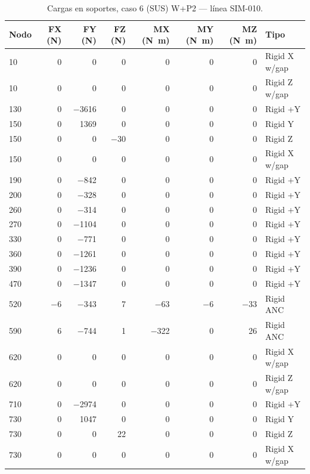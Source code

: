 \begin{table}[htbp]
  \centering
  \footnotesize
  \caption{Cargas en soportes, caso 6 (SUS) W+P2 — línea SIM-010.}
  \label{tab:restricciones-sus}
  \begin{tabular}{lrrrrrrl}
    \toprule
    Nodo & FX (\si{N}) & FY (\si{N}) & FZ (\si{N}) & MX (\si{N.m}) & MY (\si{N.m}) & MZ (\si{N.m}) & Tipo \\
    \midrule
    10 & \num{0} & \num{0} & \num{0} & \num{0} & \num{0} & \num{0} & Rigid X w/gap \\
    10 & \num{0} & \num{0} & \num{0} & \num{0} & \num{0} & \num{0} & Rigid Z w/gap \\
    130 & \num{0} & \num{-3616} & \num{0} & \num{0} & \num{0} & \num{0} & Rigid +Y \\
    150 & \num{0} & \num{1369} & \num{0} & \num{0} & \num{0} & \num{0} & Rigid Y \\
    150 & \num{0} & \num{0} & \num{-30} & \num{0} & \num{0} & \num{0} & Rigid Z \\
    150 & \num{0} & \num{0} & \num{0} & \num{0} & \num{0} & \num{0} & Rigid X w/gap \\
    190 & \num{0} & \num{-842} & \num{0} & \num{0} & \num{0} & \num{0} & Rigid +Y \\
    200 & \num{0} & \num{-328} & \num{0} & \num{0} & \num{0} & \num{0} & Rigid +Y \\
    260 & \num{0} & \num{-314} & \num{0} & \num{0} & \num{0} & \num{0} & Rigid +Y \\
    270 & \num{0} & \num{-1104} & \num{0} & \num{0} & \num{0} & \num{0} & Rigid +Y \\
    330 & \num{0} & \num{-771} & \num{0} & \num{0} & \num{0} & \num{0} & Rigid +Y \\
    360 & \num{0} & \num{-1261} & \num{0} & \num{0} & \num{0} & \num{0} & Rigid +Y \\
    390 & \num{0} & \num{-1236} & \num{0} & \num{0} & \num{0} & \num{0} & Rigid +Y \\
    470 & \num{0} & \num{-1347} & \num{0} & \num{0} & \num{0} & \num{0} & Rigid +Y \\
    520 & \num{-6} & \num{-343} & \num{7} & \num{-63} & \num{-6} & \num{-33} & Rigid ANC \\
    590 & \num{6} & \num{-744} & \num{1} & \num{-322} & \num{0} & \num{26} & Rigid ANC \\
    620 & \num{0} & \num{0} & \num{0} & \num{0} & \num{0} & \num{0} & Rigid X w/gap \\
    620 & \num{0} & \num{0} & \num{0} & \num{0} & \num{0} & \num{0} & Rigid Z w/gap \\
    710 & \num{0} & \num{-2974} & \num{0} & \num{0} & \num{0} & \num{0} & Rigid +Y \\
    730 & \num{0} & \num{1047} & \num{0} & \num{0} & \num{0} & \num{0} & Rigid Y \\
    730 & \num{0} & \num{0} & \num{22} & \num{0} & \num{0} & \num{0} & Rigid Z \\
    730 & \num{0} & \num{0} & \num{0} & \num{0} & \num{0} & \num{0} & Rigid X w/gap \\
    \bottomrule
  \end{tabular}
\end{table}

